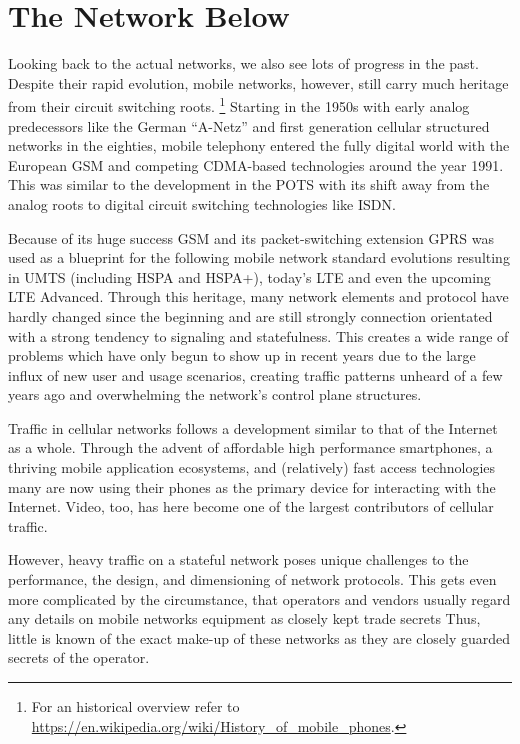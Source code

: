 \section{The Network Below}

Looking back to the actual networks, we also see lots of progress in the past. Despite their rapid evolution, mobile networks, however, still carry much heritage from their circuit switching roots. \footnote{For an historical overview refer to \url{https://en.wikipedia.org/wiki/History_of_mobile_phones}. }
Starting in the 1950s with early analog predecessors like the German ``A-Netz'' and first generation cellular structured networks in the eighties, mobile telephony entered the fully digital world with the European \gls{GSM} and competing \gls{CDMA}-based technologies around the year 1991. This was similar to the development in the \gls{POTS} with its shift away from the analog roots to digital circuit switching technologies like \gls{ISDN}.

Because of its huge success \gls{GSM} and its packet-switching extension \gls{GPRS} was used as a blueprint for the following mobile network standard evolutions resulting in \gls{UMTS} (including \gls{HSPA} and \gls{HSPA+}), today's \gls{LTE} and even the upcoming \gls{LTE} Advanced. Through this heritage, many network elements and protocol have hardly changed since the beginning and are still strongly connection orientated with a strong tendency to signaling and statefulness.
This creates a wide range of problems which have only begun to show up in recent years due to the large influx of new user and usage scenarios, creating traffic patterns unheard of a few years ago and overwhelming the network's control plane structures. 

Traffic in cellular networks follows a development similar to that of the Internet as a whole. Through the advent of affordable high performance smartphones, a thriving mobile application ecosystems, and (relatively) fast access technologies many are now using their phones as the primary device for interacting with the Internet. Video, too, has here become one of the largest contributors of cellular traffic. 

However, heavy traffic on a stateful network poses unique challenges to the performance, the design, and dimensioning of network protocols. This gets even more complicated by the circumstance, that operators and vendors usually regard any details on mobile networks equipment as closely kept trade secrets Thus, little is known of the exact make-up of these networks as they are closely guarded secrets of the operator.

